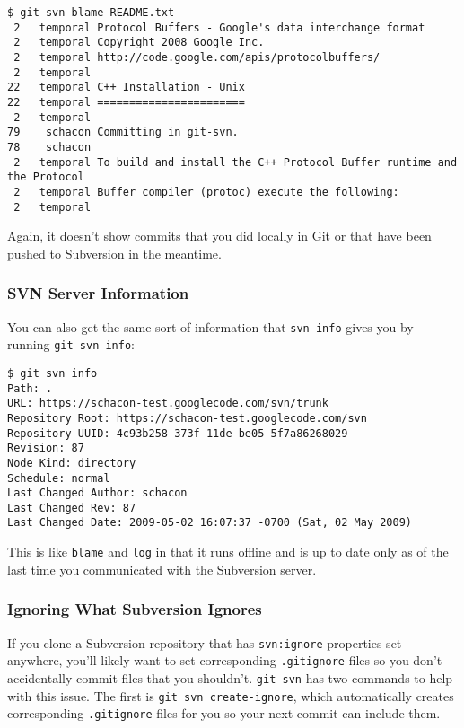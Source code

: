 \documentclass[a4paper]{book}
\begin{document}
\begin{shaded}\begin{verbatim}
$ git svn blame README.txt
 2   temporal Protocol Buffers - Google's data interchange format
 2   temporal Copyright 2008 Google Inc.
 2   temporal http://code.google.com/apis/protocolbuffers/
 2   temporal
22   temporal C++ Installation - Unix
22   temporal =======================
 2   temporal
79    schacon Committing in git-svn.
78    schacon
 2   temporal To build and install the C++ Protocol Buffer runtime and the Protocol
 2   temporal Buffer compiler (protoc) execute the following:
 2   temporal
\end{verbatim}\end{shaded}

Again, it doesn't show commits that you did locally in Git or that have been pushed to Subversion in the meantime.

\subsubsection{SVN Server Information}

You can also get the same sort of information that \texttt{svn info} gives you by running \texttt{git svn info}:

\begin{shaded}\begin{verbatim}
$ git svn info
Path: .
URL: https://schacon-test.googlecode.com/svn/trunk
Repository Root: https://schacon-test.googlecode.com/svn
Repository UUID: 4c93b258-373f-11de-be05-5f7a86268029
Revision: 87
Node Kind: directory
Schedule: normal
Last Changed Author: schacon
Last Changed Rev: 87
Last Changed Date: 2009-05-02 16:07:37 -0700 (Sat, 02 May 2009)
\end{verbatim}\end{shaded}

This is like \texttt{blame} and \texttt{log} in that it runs offline and is up to date only as of the last time you communicated with the Subversion server.

\subsubsection{Ignoring What Subversion Ignores}

If you clone a Subversion repository that has \texttt{svn:ignore} properties set anywhere, you'll likely want to set corresponding \texttt{.gitignore} files so you don't accidentally commit files that you shouldn't. \texttt{git svn} has two commands to help with this issue. The first is \texttt{git svn create-ignore}, which automatically creates corresponding \texttt{.gitignore} files for you so your next commit can include them.
\end{document}
